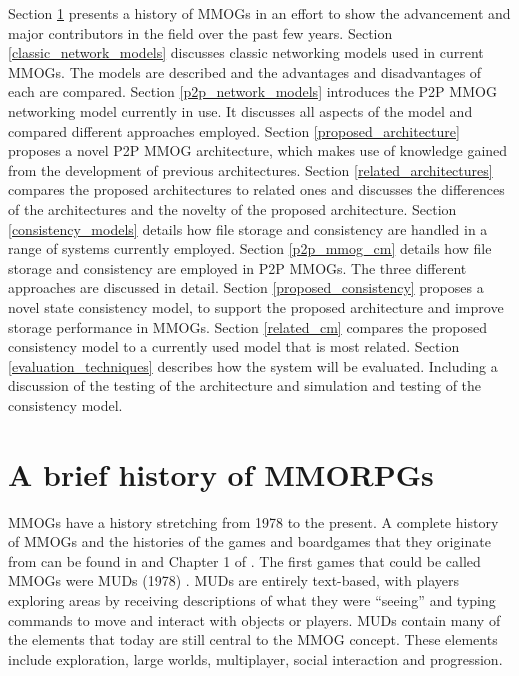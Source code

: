 \documentclass[journal,oneside,a4paper,onecolumn]{IEEEtran}
\begin{document}
Section \ref{mmog_history} presents a history of MMOGs in an effort to show the advancement and major contributors in the field over the past few years.
%
Section \ref{classic_network_models} discusses classic networking models used in current MMOGs. The models are described and the advantages and disadvantages of each are compared.
%
Section \ref{p2p_network_models} introduces the P2P MMOG networking model currently in use. It discusses all aspects of the model and compared different approaches employed.
%
Section \ref{proposed_architecture} proposes a novel P2P MMOG architecture, which makes use of knowledge gained from the development of previous architectures.
%
Section \ref{related_architectures} compares the proposed architectures to related ones and discusses the differences of the architectures and the novelty of the proposed architecture.
%
Section \ref{consistency_models} details how file storage and consistency are handled in a range of systems currently employed.
%
Section \ref{p2p_mmog_cm} details how file storage and consistency are employed in P2P MMOGs. The three different approaches are discussed in detail.
%
Section \ref{proposed_consistency} proposes a novel state consistency model, to support the proposed architecture and improve storage performance in MMOGs.
%
Section \ref{related_cm} compares the proposed consistency model to a currently used model that is most related.
%
Section \ref{evaluation_techniques} describes how the system will be evaluated. Including a discussion of the testing of the architecture and simulation and testing of the consistency model.
%



\section{A brief history of MMORPGs}
\label{mmog_history}

\acp{MMOG} have a history stretching from 1978 to the present. A complete history of \acp{MMOG} and the histories of the games and boardgames that they originate from can be found in \cite{mmog_past_present_future} and Chapter 1 of \cite{designing_virtual_worlds}. The first games that could be called \acp{MMOG} were \acp{MUD} (1978) \cite{mud_intro}. \acp{MUD} are entirely text-based, with players exploring areas by receiving descriptions of what they were ``seeing'' and typing commands to move and interact with objects or players. \acp{MUD} contain many of the elements that today are still central to the \ac{MMOG} concept. These elements include exploration, large worlds, multiplayer, social interaction and progression.
\end{document}
